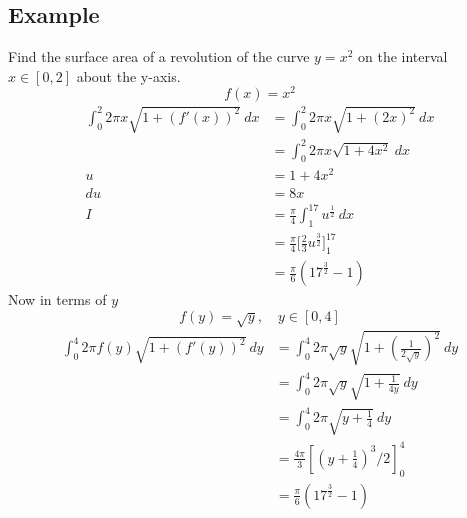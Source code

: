 \documentclass{article}
\theoremstyle{mytheoremstyle}
\theoremstyle{mytheoremstyle}
\theoremstyle{myproblemstyle}
\begin{document}
    \subsection*{Example}
    Find the surface area of a revolution of the curve $y=x^2$ on the interval
    $x\in [0,2]$ about the y-axis.
    \[
        f(x) = x^2
    \]
    \begin{align*}
        \int_{0}^{2} 2\pi x \sqrt{1+(f'(x))^2} \ dx
        &= \int_{0}^{2} 2\pi x \sqrt{1+(2x)^2} \ dx \\
        &= \int_{0}^{2} 2\pi x \sqrt{1 + 4x^2} \ dx \\
        u &= 1 + 4x^2 \\
        du &= 8x \\
        I &= \frac{\pi}{4} \int_{1}^{17} u^{\frac{1}{2}} \ dx \\
          &= \frac{\pi}{4} \Big[ \frac{2}{3} u^{\frac{3}{2}}\Big]_1^{17} \\
        &= \frac{\pi}{6} (17^{\frac{3}{2}} - 1)
    \end{align*}
    Now in terms of $y$
    \[
        f(y) = \sqrt{y}, \quad y\in[0, 4]
    \]
    \begin{align*}
        \int_{0}^{4} 2 \pi f(y) \sqrt{1+(f'(y))^2} \ dy
        &= \int_{0}^{4} 2 \pi \sqrt{y} \sqrt{1+(\frac{1}{2\sqrt{y}})^2} \ dy \\
        &= \int_{0}^{4} 2 \pi \sqrt{y} \sqrt{1+\frac{1}{4y}} \ dy \\
        &= \int_{0}^{4} 2 \pi \sqrt{y+\frac{1}{4}} \ dy \\
        &= \frac{4\pi}{3} [(y+ \frac{1}{4} )^3/2]_0^4 \\
        &= \frac{\pi}{6} (17^{\frac{3}{2}} - 1)
    \end{align*}
\end{document}
